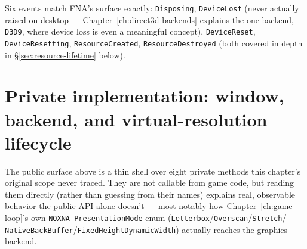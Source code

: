 Six events match FNA's surface exactly: \texttt{Disposing}, \texttt{DeviceLost} (never actually
raised on desktop --- Chapter~\ref{ch:direct3d-backends} explains the one backend,
\texttt{D3D9}, where device loss is even a meaningful concept), \texttt{DeviceReset},
\texttt{DeviceResetting}, \texttt{ResourceCreated}, \texttt{ResourceDestroyed} (both covered in
depth in \S\ref{sec:resource-lifetime} below).

\section{Private implementation: window, backend, and virtual-resolution lifecycle}
\label{sec:private-lifecycle}

The public surface above is a thin shell over eight private methods this chapter's original
scope never traced. They are not callable from game code, but reading them directly (rather
than guessing from their names) explains real, observable behavior the public API alone
doesn't --- most notably how Chapter~\ref{ch:game-loop}'s own \texttt{NOXNA
PresentationMode} enum (\texttt{Letterbox}/\texttt{Overscan}/\texttt{Stretch}/%
\texttt{NativeBackBuffer}/\texttt{FixedHeightDynamicWidth}) actually reaches the graphics
backend.

